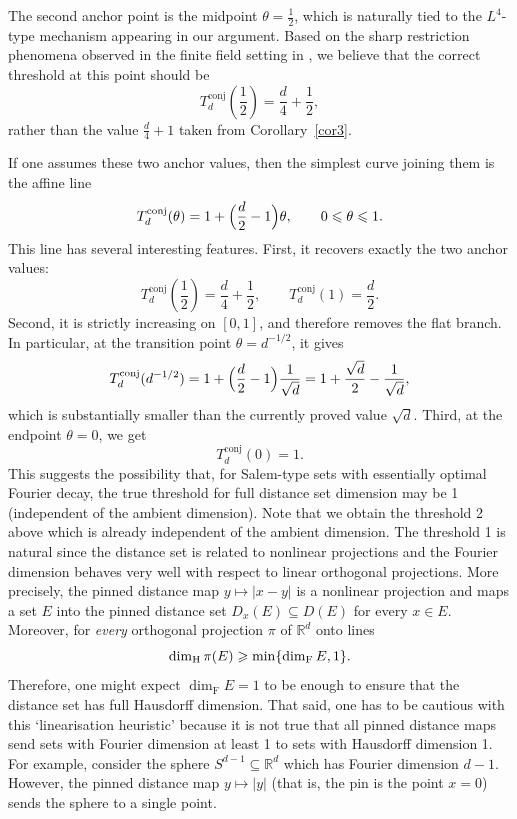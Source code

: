 \documentclass[11pt]{amsart}
\numberwithin{equation}{section}
\newcommand{\rd}{\mathbb{R}^d}
\renewcommand{\le}{\leqslant}
\renewcommand{\geq}{\geqslant}
\newcommand{\hd}{\dim_{\textup{H}}}
\newcommand{\fd}{\dim_{\mathrm{F}}}
\theoremstyle{plain}
\theoremstyle{remark}
\begin{document}
The second anchor point is the midpoint \(\theta=\frac12\), which is naturally tied to the \(L^4\)-type mechanism appearing in our argument. Based on the sharp restriction phenomena observed in the finite field setting in \cite{CGKPTZ25}, we believe that the correct threshold at this point should be
\[
T_d^{\mathrm{conj}}\!\left(\frac12\right)=\frac d4+\frac12,
\]
rather than the value \(\frac d4+1\) taken from Corollary~\ref{cor3}. 

If one assumes these two anchor values, then the simplest curve joining them is the affine line
\begin{equation}\label{eq:affine-threshold-model}
T_d^{\mathrm{conj}}(\theta)
=
1+\Bigl(\frac d2-1\Bigr)\theta,
\qquad 0\le \theta\le 1.
\end{equation}
This line has several interesting features. First, it recovers exactly the two anchor values:
\[
T_d^{\mathrm{conj}}\!\left(\frac12\right)=\frac d4+\frac12,
\qquad
T_d^{\mathrm{conj}}(1)=\frac d2.
\]
Second, it is strictly increasing on \([0,1]\), and therefore removes the flat  branch. In particular, at the transition point \(\theta=d^{-1/2}\), it gives
\begin{equation}\label{eq:Td-sqrtd-inverse}
T_d^{\mathrm{conj}}(d^{-1/2})
=
1+\Bigl(\frac d2-1\Bigr)\frac1{\sqrt d}
=
1+\frac{\sqrt d}{2}-\frac1{\sqrt d},
\end{equation}
which is substantially smaller than the currently proved value \(\sqrt d\). Third, at the  endpoint \(\theta=0\), we get
\[
T_d^{\mathrm{conj}}(0)=1.
\]
This suggests the possibility that, for Salem-type sets with essentially optimal Fourier decay, the true threshold for full distance set dimension may be 1 (independent of the ambient dimension).  Note that we   obtain the threshold  2 above which is already independent of the ambient dimension.  The threshold 1 is natural since the distance set is related to nonlinear projections and the Fourier dimension behaves very well with respect to linear orthogonal projections.  More precisely, the pinned distance map $y \mapsto |x-y|$ is a nonlinear projection and maps a set $E$ into the pinned distance set $D_x(E) \subseteq D(E)$ for every $x \in E$.  Moreover, for \emph{every} orthogonal projection $\pi$ of $\rd$ onto lines 
\[
\hd \pi(E) \geq \min\{\fd E,1\}.
\]
Therefore, one might expect $\fd E = 1$ to be enough to ensure that the distance set has full Hausdorff dimension.  That said, one has to be cautious with this `linearisation heuristic' because it is not true that all  pinned distance maps send sets with Fourier dimension at least 1 to sets with Hausdorff dimension 1.  For example, consider the sphere $S^{d-1} \subseteq \rd$ which has Fourier dimension $d-1$. However, the pinned distance map $y \mapsto |y|$ (that is, the pin is the point $x=0$) sends the sphere to a single point.
\end{document}
